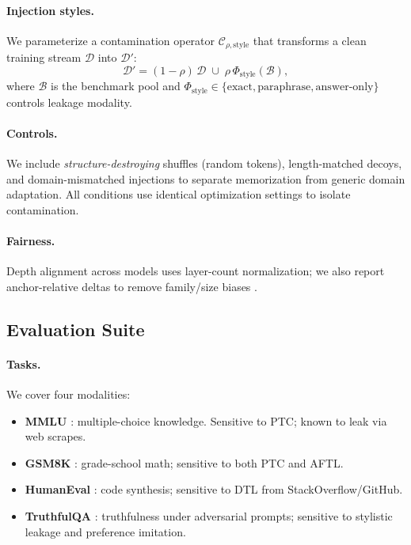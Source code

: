 \documentclass[11pt]{article}
\begin{document}
\paragraph{Injection styles.} We parameterize a contamination operator $\mathcal{C}_{\rho,\mathrm{style}}$ that transforms a clean training stream $\mathcal{D}$ into $\mathcal{D}'$:
\[
\mathcal{D}'=(1-\rho)\,\mathcal{D} \;\cup\; \rho\,\Phi_{\mathrm{style}}(\mathcal{B}),
\]
where $\mathcal{B}$ is the benchmark pool and $\Phi_{\mathrm{style}}\in\{\text{exact},\text{paraphrase},\text{answer-only}\}$ controls leakage modality.

\paragraph{Controls.} We include \emph{structure-destroying} shuffles (random tokens), length-matched decoys, and domain-mismatched injections to separate memorization from generic domain adaptation. All conditions use identical optimization settings to isolate contamination.

\paragraph{Fairness.} Depth alignment across models uses layer-count normalization; we also report anchor-relative deltas to remove family/size biases \citep{kornblith2019cka,raghu2017svcca}.

\subsection*{Evaluation Suite}
\label{subsec:eval}
\paragraph{Tasks.} We cover four modalities:
\begin{itemize}
    \item \textbf{MMLU} \citep{hendrycks2021mmlu}: multiple-choice knowledge. Sensitive to PTC; known to leak via web scrapes.
    \item \textbf{GSM8K} \citep{cobbe2021gsm8k}: grade-school math; sensitive to both PTC and AFTL.
    \item \textbf{HumanEval} \citep{chen2021humaneval}: code synthesis; sensitive to DTL from StackOverflow/GitHub.
    \item \textbf{TruthfulQA} \citep{lin2021truthfulqa}: truthfulness under adversarial prompts; sensitive to stylistic leakage and preference imitation.
\end{itemize}
\end{document}
